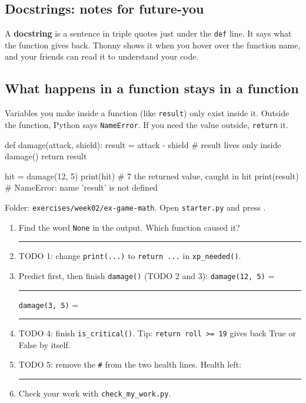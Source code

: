 \subsection{Docstrings: notes for future-you}
A \textbf{docstring} is a sentence in triple quotes just under the \texttt{def} line. It says what the function gives back.
Thonny shows it when you hover over the function name, and your friends can read it to understand your code.

\subsection{What happens in a function stays in a function}
Variables you make inside a function (like \texttt{result}) only exist inside it. Outside the function, Python says
\texttt{NameError}. If you need the value outside, \texttt{return} it.
\begin{pycode}
def damage(attack, shield):
    result = attack - shield    # result lives only inside damage()
    return result

hit = damage(12, 5)
print(hit)        # 7     the returned value, caught in hit
print(result)     # NameError: name 'result' is not defined
\end{pycode}

\begin{exercise}
Folder: \texttt{exercises/week02/ex-game-math}. Open \texttt{starter.py} and press .
\begin{enumerate}[leftmargin=1.4em]
  \item Find the word \texttt{None} in the output. Which function caused it? \rule{4cm}{0.4pt}
  \item TODO 1: change \texttt{print(...)} to \texttt{return ...} in \texttt{xp\_needed()}.
  \item Predict first, then finish \texttt{damage()} (TODO 2 and 3):\quad
        \texttt{damage(12, 5)} = \rule{1.5cm}{0.4pt}\qquad \texttt{damage(3, 5)} = \rule{1.5cm}{0.4pt}
  \item TODO 4: finish \texttt{is\_critical()}. Tip: \texttt{return roll >= 19} gives back True or False by itself.
  \item TODO 5: remove the \texttt{\#} from the two health lines. Health left: \rule{1.5cm}{0.4pt}
  \item Check your work with \texttt{check\_my\_work.py}.
\end{enumerate}
\end{exercise}

